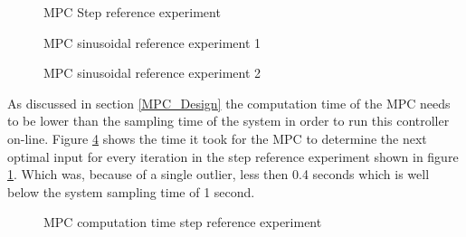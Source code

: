 \begin{figure}[ht]
    \centering
    
    \caption{MPC Step reference experiment}
    \label{fig:MPCstep}
\end{figure}


\begin{figure}[ht]
    \centering
    
    \caption{MPC sinusoidal reference experiment 1}
    \label{fig:MPCper1}
\end{figure}

\begin{figure}[ht]
    \centering
    
    \caption{MPC sinusoidal reference experiment 2}
    \label{fig:MPCper2}
\end{figure}

As discussed in section \ref{MPC_Design} the computation time of the MPC needs to be lower than the sampling time of the system in order to run this controller on-line. Figure \ref{fig:MPCcompTime} shows the time it took for the MPC to determine the next optimal input for every iteration in the step reference experiment shown in figure \ref{fig:MPCstep}. Which was, because of a single outlier, less then 0.4 seconds which is well below the system sampling time of 1 second. 
\begin{figure}[h]
    \centering
    
    \caption{MPC computation time step reference experiment}
    \label{fig:MPCcompTime}
\end{figure}

